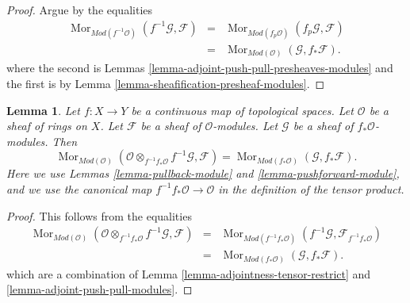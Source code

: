 \documentclass{stacks-project}
\theoremstyle{plain}
\newtheorem{lemma}[subsection]{Lemma}
\theoremstyle{definition}
\theoremstyle{remark}
\numberwithin{equation}{subsection}
\def\Mor{\mathop{\mathrm{Mor}}\nolimits}
\begin{document}
\begin{proof}
Argue by the equalities
\begin{eqnarray*}
\Mor_{\textit{Mod}(f^{-1}\mathcal{O})}(f^{-1}\mathcal{G}, \mathcal{F})
& = &
\Mor_{\textit{Mod}(f_p\mathcal{O})}(f_p\mathcal{G}, \mathcal{F}) \\
& = &
\Mor_{\textit{Mod}(\mathcal{O})}(\mathcal{G}, f_*\mathcal{F}).
\end{eqnarray*}
where the second is
Lemmas \ref{lemma-adjoint-push-pull-presheaves-modules}
and the first is by Lemma \ref{lemma-sheafification-presheaf-modules}.
\end{proof}

\begin{lemma}
\label{lemma-adjoint-pull-push-modules}
Let $f : X \to Y$ be a continuous map of topological spaces.
Let $\mathcal{O}$ be a sheaf of rings on $X$.
Let $\mathcal{F}$ be a sheaf of $\mathcal{O}$-modules.
Let $\mathcal{G}$ be a sheaf of $f_*\mathcal{O}$-modules.
Then
$$
\Mor_{\textit{Mod}(\mathcal{O})}(
\mathcal{O} \otimes_{f^{-1}f_*\mathcal{O}} f^{-1}\mathcal{G}, \mathcal{F})
=
\Mor_{\textit{Mod}(f_*\mathcal{O})}(\mathcal{G}, f_*\mathcal{F}).
$$
Here we use
Lemmas \ref{lemma-pullback-module}
and \ref{lemma-pushforward-module}, and we use
the canonical map $f^{-1}f_*\mathcal{O} \to \mathcal{O}$
in the definition of the tensor product.
\end{lemma}

\begin{proof}
This follows from the equalities
\begin{eqnarray*}
\Mor_{\textit{Mod}(\mathcal{O})}(
\mathcal{O} \otimes_{f^{-1}f_*\mathcal{O}} f^{-1}\mathcal{G}, \mathcal{F})
& = &
\Mor_{\textit{Mod}(f^{-1}f_*\mathcal{O})}(
f^{-1}\mathcal{G}, \mathcal{F}_{f^{-1}f_*\mathcal{O}}) \\
& = &
\Mor_{\textit{Mod}(f_*\mathcal{O})}(\mathcal{G}, f_*\mathcal{F}).
\end{eqnarray*}
which are a combination of
Lemma \ref{lemma-adjointness-tensor-restrict}
and \ref{lemma-adjoint-push-pull-modules}.
\end{proof}
\end{document}

